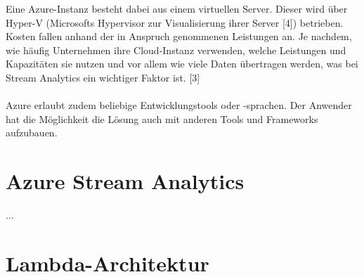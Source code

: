 Eine Azure-Instanz besteht dabei aus einem virtuellen Server. Dieser wird über Hyper-V (Microsofts Hypervisor zur Visualisierung ihrer Server [4]) betrieben. Kosten fallen anhand der in Anspruch genommenen Leistungen an. Je nachdem, wie häufig Unternehmen ihre Cloud-Instanz verwenden, welche Leistungen und Kapazitäten sie nutzen und vor allem wie viele Daten übertragen werden, was bei Stream Analytics ein wichtiger Faktor ist. [3]\\ \\
Azure erlaubt zudem beliebige Entwicklungstools oder -sprachen. Der Anwender hat die Möglichkeit die Lösung auch mit anderen Tools und Frameworks aufzubauen. 

\section{Azure Stream Analytics}
...

\section{Lambda-Architektur}


